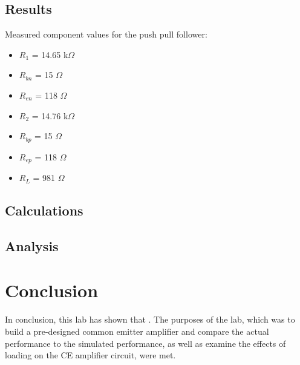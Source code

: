 \documentclass[12pt,letterpaper]{report}
\begin{document}
\subsection*{Results}

Measured component values for the push pull follower:
\begin{itemize}
\item $R_1$ = 14.65 k$\Omega$
\item $R_{bn}$ = 15 $\Omega$
\item $R_{en}$ = 118 $\Omega$

\item $R_2$ = 14.76 k$\Omega$
\item $R_{bp}$ = 15 $\Omega$
\item $R_{ep}$ = 118 $\Omega$

\item $R_L$ = 981 $\Omega$
\end{itemize}


\subsection*{Calculations}


\subsection*{Analysis}


\section*{Conclusion}

In conclusion, this lab has shown that 
. The purposes of the lab, which was to build a pre-designed common emitter amplifier and compare the actual performance to the simulated performance, as well as  examine the effects of loading on the CE amplifier circuit, were met.
\end{document}
